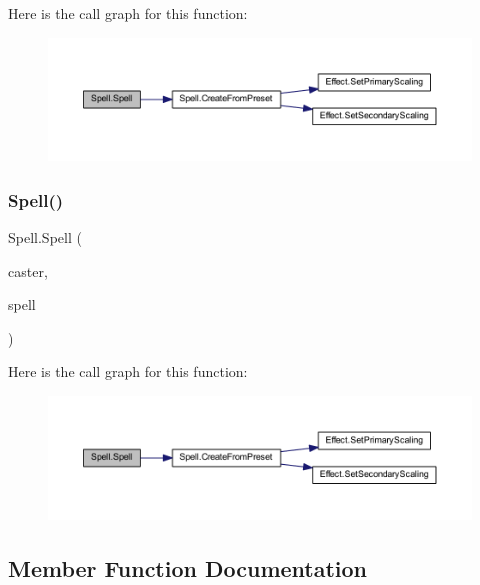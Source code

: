 Here is the call graph for this function\+:
\nopagebreak
\begin{figure}[H]
\begin{center}
\leavevmode
\includegraphics[width=350pt]{class_spell_a34acc5591bc0b3c8a1d9468e952be3c4_cgraph}
\end{center}
\end{figure}
\mbox{\label{class_spell_a555a02d92d6de53a3b6d39bfda11c2cc}} 
\subsubsection{\texorpdfstring{Spell()}{Spell()}\hspace{0.1cm}{\footnotesize\ttfamily [2/2]}}
{\footnotesize\ttfamily Spell.\+Spell (\begin{DoxyParamCaption}\item[{\mbox{\hyperlink{class_base_unit}{Base\+Unit}}}]{caster,  }\item[{\mbox{\hyperlink{class_spell_a5520e850e7000a6156b3456672b72ed1}{Preset}}}]{spell }\end{DoxyParamCaption})}

Here is the call graph for this function\+:
\nopagebreak
\begin{figure}[H]
\begin{center}
\leavevmode
\includegraphics[width=350pt]{class_spell_a555a02d92d6de53a3b6d39bfda11c2cc_cgraph}
\end{center}
\end{figure}


\subsection{Member Function Documentation}
\mbox{\label{class_spell_aa020942716a6504fc6b23351a4baa3b6}} 
